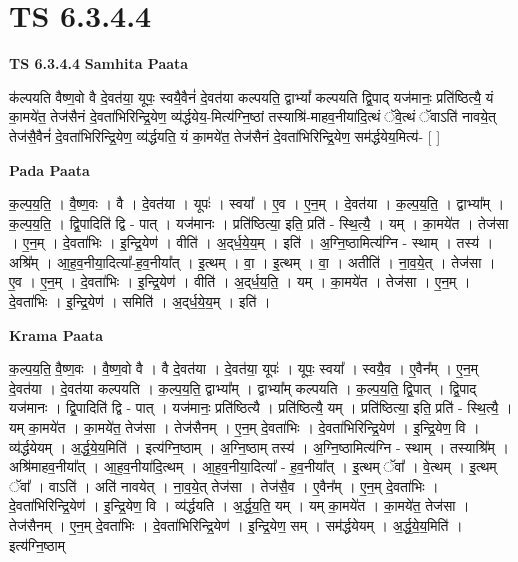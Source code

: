 \documentclass[17pt]{extarticle}
\begin{document}
\section{ TS 6.3.4.4 }

\textbf{TS 6.3.4.4 } \newline
\textbf{Samhita Paata} \newline

क॑ल्पयति वैष्ण॒वो वै दे॒वत॑या॒ यूपः॒ स्वयै॒वैनं॑ दे॒वत॑या कल्पयति॒ द्वाभ्यां᳚ कल्पयति द्वि॒पाद् यज॑मानः॒ प्रति॑ष्ठित्यै॒ यं का॒मये॑त॒ तेज॑सैनं दे॒वता॑भिरिन्द्रि॒येण॒ व्य॑र्द्धयेय॒-मित्य॑ग्नि॒ष्ठां तस्याश्रि॑-माहव॒नीया॑दि॒त्थं ॅवे॒त्थं ॅवाऽति॑ नावये॒त् तेज॑सै॒वैनं॑ दे॒वता॑भिरिन्द्रि॒येण॒ व्य॑र्द्धयति॒ यं का॒मये॑त॒ तेज॑सैनं दे॒वता॑भिरिन्द्रि॒येण॒ सम॑र्द्धयेय॒मित्य॑- [  ] \newline

\textbf{Pada Paata} \newline

क॒ल्प॒य॒ति॒ । वै॒ष्ण॒वः । वै । दे॒वत॑या । यूपः॑ । स्वया᳚ । ए॒व । ए॒न॒म् । दे॒वत॑या । क॒ल्प॒य॒ति॒ । द्वाभ्या᳚म् । क॒ल्प॒य॒ति॒ । द्वि॒पादिति॑ द्वि - पात् । यज॑मानः । प्रति॑ष्ठित्या॒ इति॒ प्रति॑ - स्थि॒त्यै॒ । यम् । का॒मये॑त । तेज॑सा । ए॒न॒म् । दे॒वता॑भिः । इ॒न्द्रि॒येण॑ । वीति॑ । अ॒द्‌र्ध॒ये॒य॒म् । इति॑ । अ॒ग्नि॒ष्ठामित्य॑ग्नि - स्थाम् । तस्य॑ । अश्रि᳚म् । आ॒ह॒व॒नीया॒दित्या᳚-ह॒व॒नीया᳚त् । इ॒त्थम् । वा॒ । इ॒त्थम् । वा॒ । अतीति॑ । ना॒व॒ये॒त् । तेज॑सा । ए॒व । ए॒न॒म् । दे॒वता॑भिः । इ॒न्द्रि॒येण॑ । वीति॑ । अ॒द्‌र्ध॒य॒ति॒ । यम् । का॒मये॑त । तेज॑सा । ए॒न॒म् । दे॒वता॑भिः । इ॒न्द्रि॒येण॑ । समिति॑ । अ॒द्‌र्ध॒ये॒य॒म् । इति॑ ।  \newline


\textbf{Krama Paata} \newline

क॒ल्प॒य॒ति॒ वै॒ष्ण॒वः । वै॒ष्ण॒वो वै । वै दे॒वत॑या । दे॒वत॑या॒ यूपः॑ । यूपः॒ स्वया᳚ । स्वयै॒व । ए॒वैन᳚म् । ए॒न॒म् दे॒वत॑या । दे॒वत॑या कल्पयति । क॒ल्प॒य॒ति॒ द्वाभ्या᳚म् । द्वाभ्या᳚म् कल्पयति । क॒ल्प॒य॒ति॒ द्वि॒पात् । द्वि॒पाद् यज॑मानः । द्वि॒पादिति॑ द्वि - पात् । यज॑मानः॒ प्रति॑ष्ठित्यै । प्रति॑ष्ठित्यै॒ यम् । प्रति॑ष्ठित्या॒ इति॒ प्रति॑ - स्थि॒त्यै॒ । यम् का॒मये॑त । का॒मये॑त॒ तेज॑सा । तेज॑सैनम् । ए॒न॒म् दे॒वता॑भिः । दे॒वता॑भिरिन्द्रि॒येण॑ । इ॒न्द्रि॒येण॒ वि । व्य॑र्द्धयेयम् । अ॒र्द्ध॒ये॒य॒मिति॑ । इत्य॑ग्नि॒ष्ठाम् । अ॒ग्नि॒ष्ठाम् तस्य॑ । अ॒ग्नि॒ष्ठामित्य॑ग्नि - स्थाम् । तस्याश्रि᳚म् । अश्रि॑माहव॒नीया᳚त् । आ॒ह॒व॒नीया॑दि॒त्थम् । आ॒ह॒व॒नीया॒दित्या᳚ - ह॒व॒नीया᳚त् । इ॒त्थम् ॅवा᳚ । वे॒त्थम् । इ॒त्थम् ॅवा᳚ । वाऽति॑ । अति॑ नावयेत् । ना॒व॒ये॒त् तेज॑सा । तेज॑सै॒व । ए॒वैन᳚म् । ए॒न॒म् दे॒वता॑भिः । दे॒वता॑भिरिन्द्रि॒येण॑ । इ॒न्द्रि॒येण॒ वि । व्य॑र्द्धयति । अ॒र्द्ध॒य॒ति॒ यम् । यम् का॒मये॑त । का॒मये॑त॒ तेज॑सा । तेज॑सैनम् । ए॒न॒म् दे॒वता॑भिः । दे॒वता॑भिरिन्द्रि॒येण॑ । इ॒न्द्रि॒येण॒ सम् । सम॑र्द्धयेयम् । अ॒र्द्ध॒ये॒य॒मिति॑ । इत्य॑ग्नि॒ष्ठाम् \newline
\end{document}

